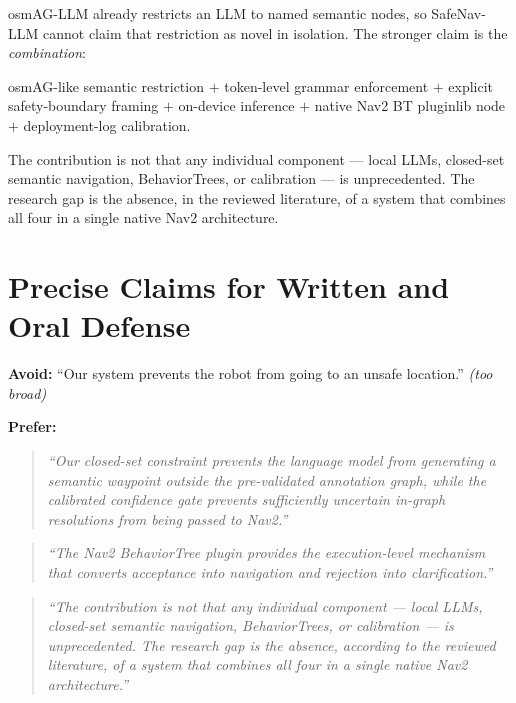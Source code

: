 \documentclass[11pt,a4paper]{article}
\newcommand{\gapbox}[2]{%
  \begin{tcolorbox}[colback=softblue,colframe=navyblue,title={#1},fonttitle=\bfseries,breakable]
  #2
  \end{tcolorbox}%
}
\begin{document}
\gapbox{The precise novelty claim}{
osmAG-LLM already restricts an LLM to named semantic nodes, so SafeNav-LLM
cannot claim that restriction as novel in isolation. The stronger claim is the
\emph{combination}:
\begin{center}
osmAG-like semantic restriction $+$ token-level grammar enforcement $+$
explicit safety-boundary framing $+$ on-device inference $+$ native Nav2 BT
pluginlib node $+$ deployment-log calibration.
\end{center}
The contribution is not that any individual component --- local LLMs,
closed-set semantic navigation, BehaviorTrees, or calibration --- is
unprecedented. The research gap is the absence, in the reviewed literature,
of a system that combines all four in a single native Nav2 architecture.
}

\section{Precise Claims for Written and Oral Defense}
\label{sec:viva}

\begin{tcolorbox}[colback=softyellow,colframe=navyblue,title={Recommended phrasing},fonttitle=\bfseries,breakable]
\textbf{Avoid:} ``Our system prevents the robot from going to an unsafe
location.'' \emph{(too broad)}

\textbf{Prefer:}
\begin{quote}
\itshape ``Our closed-set constraint prevents the language model from
generating a semantic waypoint outside the pre-validated annotation graph,
while the calibrated confidence gate prevents sufficiently uncertain in-graph
resolutions from being passed to Nav2.''
\end{quote}
\begin{quote}
\itshape ``The Nav2 BehaviorTree plugin provides the execution-level
mechanism that converts acceptance into navigation and rejection into
clarification.''
\end{quote}
\begin{quote}
\itshape ``The contribution is not that any individual component --- local
LLMs, closed-set semantic navigation, BehaviorTrees, or calibration --- is
unprecedented. The research gap is the absence, according to the reviewed
literature, of a system that combines all four in a single native Nav2
architecture.''
\end{quote}
\end{tcolorbox}
\end{document}
